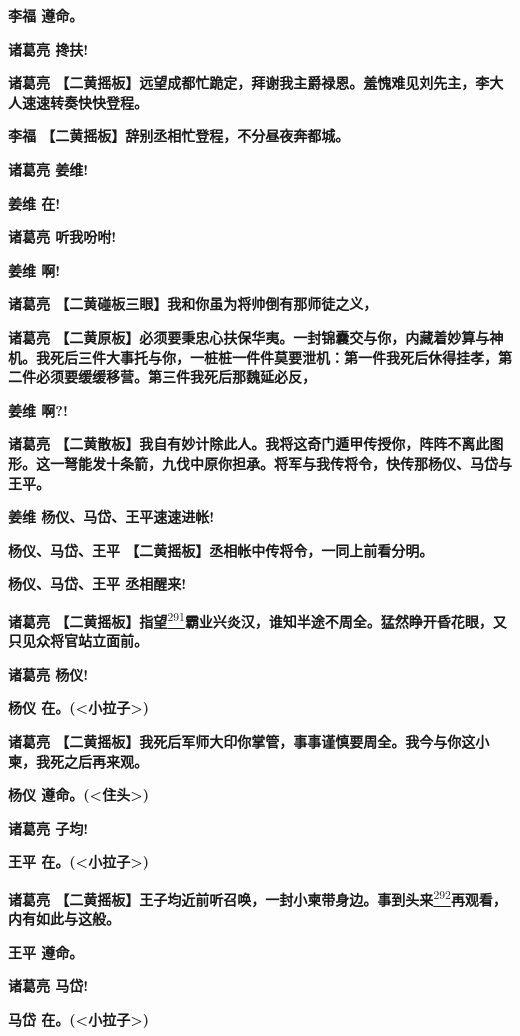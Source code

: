 \textbf{李福 遵命。}

\textbf{诸葛亮 搀扶!}

\textbf{诸葛亮
【二黄摇板】远望成都忙跪定，拜谢我主爵禄恩。羞愧难见刘先主，李大人速速转奏快快登程。}

\textbf{李福 【二黄摇板】辞别丞相忙登程，不分昼夜奔都城。}

\textbf{诸葛亮 姜维!}

\textbf{姜维 在!}

\textbf{诸葛亮 听我吩咐!}

\textbf{姜维 啊!}

\textbf{诸葛亮 【二黄碰板三眼】我和你虽为将帅倒有那师徒之义，}

\textbf{诸葛亮
【二黄原板】必须要秉忠心扶保华夷。一封锦囊交与你，内藏着妙算与神机。我死后三件大事托与你，一桩桩一件件莫要泄机：第一件我死后休得挂孝，第二件必须要缓缓移营。第三件我死后那魏延必反，}

\textbf{姜维 啊?!}

\textbf{诸葛亮
【二黄散板】我自有妙计除此人。我将这奇门遁甲传授你，阵阵不离此图形。这一弩能发十条箭，九伐中原你担承。将军与我传将令，快传那杨仪、马岱与王平。}

\textbf{姜维 杨仪、马岱、王平速速进帐!}

\textbf{杨仪、马岱、王平 【二黄摇板】丞相帐中传将令，一同上前看分明。}

\textbf{杨仪、马岱、王平 丞相醒来!}

\textbf{诸葛亮
【二黄摇板】指望}\protect\hyperlink{fn291}{\textsuperscript{291}}\textbf{霸业兴炎汉，谁知半途不周全。猛然睁开昏花眼，又只见众将官站立面前。}

\textbf{诸葛亮 杨仪!}

\textbf{杨仪 在。(\textless{}小拉子\textgreater{})}

\textbf{诸葛亮
【二黄摇板】我死后军师大印你掌管，事事谨慎要周全。我今与你这小柬，我死之后再来观。}

\textbf{杨仪 遵命。(\textless{}住头\textgreater{})}

\textbf{诸葛亮 子均!}

\textbf{王平 在。(\textless{}小拉子\textgreater{})}

\textbf{诸葛亮
【二黄摇板】王子均近前听召唤，一封小柬带身边。事到头来}\protect\hyperlink{fn292}{\textsuperscript{292}}\textbf{再观看，内有如此与这般。}

\textbf{王平 遵命。}

\textbf{诸葛亮 马岱!}

\textbf{马岱 在。(\textless{}小拉子\textgreater{})}

